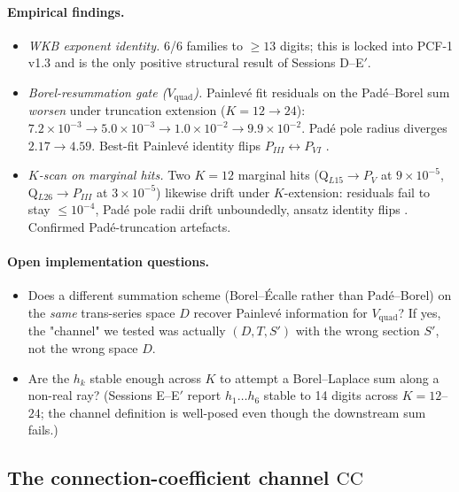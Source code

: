 \documentclass[11pt,reqno]{amsart}
\theoremstyle{plain}
\theoremstyle{definition}
\theoremstyle{remark}
\newcommand{\CC}{\mathrm{CC}}
\newcommand{\Vquad}{V_{\mathrm{quad}}}
\begin{document}
\paragraph{Empirical findings.}
\begin{itemize}
\item \emph{WKB exponent identity.} 6/6 families to
$\ge 13$ digits; this is locked into PCF-1 v1.3 and is the
only positive structural result of Sessions D--E$'$.
\item \emph{Borel-resummation gate ($\Vquad$).} Painlev\'e
fit residuals on the Pad\'e--Borel sum
\emph{worsen} under truncation extension
($K=12 \to 24$): $7.2\times 10^{-3} \to 5.0 \times 10^{-3}
\to 1.0 \times 10^{-2} \to 9.9 \times 10^{-2}$. Pad\'e pole
radius diverges $2.17 \to 4.59$. Best-fit Painlev\'e identity
flips $P_{III} \leftrightarrow P_{VI}$
\cite{siarc_borel_5x}.
\item \emph{$K$-scan on marginal hits.} Two $K=12$ marginal
hits (Q$_{L15} \to P_V$ at $9 \times 10^{-5}$,
Q$_{L26} \to P_{III}$ at $3 \times 10^{-5}$) likewise drift
under $K$-extension: residuals fail to stay $\le 10^{-4}$,
Pad\'e pole radii drift unboundedly, ansatz identity flips
\cite{siarc_borel_kscan}. Confirmed Pad\'e-truncation
artefacts.
\end{itemize}

\paragraph{Open implementation questions.}
\begin{itemize}
\item Does a different summation scheme (Borel--\'Ecalle
\cite{ecalle1981fonctions, sauzin2014resurgent} rather than
Pad\'e--Borel) on the \emph{same} trans-series space $D$
recover Painlev\'e information for $\Vquad$? If yes, the
"channel" we tested was actually $(D,T,S')$ with the wrong
section $S'$, not the wrong space $D$.
\item Are the $h_k$ stable enough across $K$ to attempt a
Borel--Laplace sum along a non-real ray? (Sessions E--E$'$
report $h_1 \ldots h_6$ stable to 14 digits across
$K=12$--$24$; the channel definition is well-posed even
though the downstream sum fails.)
\end{itemize}

\subsection{The connection-coefficient channel $\CC$}
\label{ssec:cc}
\end{document}
